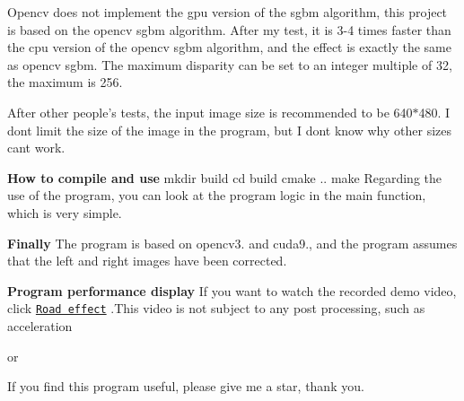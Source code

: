 Opencv does not implement the gpu version of the sgbm algorithm, this project is based on the opencv sgbm algorithm. After my test, it is 3-\/4 times faster than the cpu version of the opencv sgbm algorithm, and the effect is exactly the same as opencv sgbm. The maximum disparity can be set to an integer multiple of 32, the maximum is 256.

After other people’s tests, the input image size is recommended to be 640$\ast$480. I don\textquotesingle{}t limit the size of the image in the program, but I don\textquotesingle{}t know why other sizes can\textquotesingle{}t work.

{\bfseries How to compile and use} mkdir build cd build cmake .. make Regarding the use of the program, you can look at the program logic in the main function, which is very simple.

{\bfseries Finally} The program is based on opencv3. and cuda9., and the program assumes that the left and right images have been corrected.

{\bfseries Program performance display} If you want to watch the recorded demo video, click \href{https://v.youku.com/v_show/id_XMzk0NjE1MDEwNA==.html?spm=a2hzp.8253869.0.0}{\tt Road effect} .This video is not subject to any post processing, such as acceleration

or  

If you find this program useful, please give me a star, thank you. 